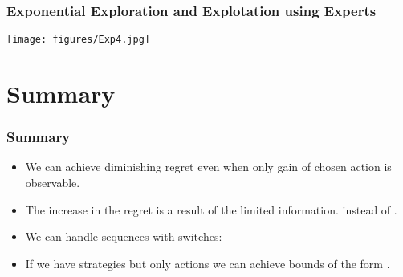 \documentclass{beamer}
\begin{document}
\begin{frame}
\frametitle{Exponential Exploration and Explotation using Experts}
\texttt{[image: figures/Exp4.jpg]}
\end{frame}

\section{Summary}

\begin{frame}
\frametitle{Summary}
\begin{itemize}
\item We can achieve diminishing regret even when only gain of chosen action is observable.
\item The increase in the regret is a result of the limited information. 
 instead of .
\item We can handle sequences with  switches:
\item If we have  strategies  but only  actions  we can achieve bounds of the form .
\end{itemize}
\end{frame}


\iffalse %
\begin{frame}
\frametitle{XXX}
\begin{itemize}
\item XXX
\end{itemize}
\end{frame}

\fi %
\end{document}
